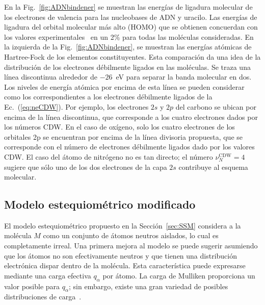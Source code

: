 En la Fig.~\ref{fig:ADNbindener} se muestran las energías de ligadura 
molecular de los electrones de valencia para las nucleobases de ADN y 
uracilo. Las energías de ligadura del orbital molecular más alto (HOMO) 
que se obtienen concuerdan con los valores 
experimentales~\cite{Hush,Verkin,Dougherty} en un 2\% para todas las 
moléculas consideradas. En la izquierda de la Fig.~\ref{fig:ADNbindener}, 
se muestran las energías atómicas de Hartree-Fock de los elementos 
constituyentes. Esta comparación da una idea de la distribución de los 
electrones débilmente ligados en las moléculas. Se traza una línea 
discontinua alrededor de $-26$~eV para separar la banda molecular en 
dos. Los niveles de energía atómica por encima de esta línea se pueden 
considerar como los correspondientes a los electrones débilmente ligados 
de la Ec.~(\ref{eq:neCDW}). Por ejemplo, los electrones $2s$ y $2p$ del 
carbono se ubican por encima de la línea discontinua, que corresponde a 
los cuatro electrones dados por los números CDW. En el caso de oxígeno, 
solo los cuatro electrones de los orbitales 2p se encuentran por encima 
de la línea divisoria propuesta, que se corresponde con el número de 
electrones débilmente ligados dado por los valores CDW. El caso del 
átomo de nitrógeno no es tan directo; el número $\nu_{N}^{\text{CDW}}=4$ 
sugiere que sólo uno de los dos electrones de la capa $2s$ contribuye al 
esquema molecular.

\subsection{Modelo estequiométrico modificado}

El modelo estequiométrico propuesto en la Sección~\ref{sec:SSM} 
considera a la molécula $M$ como un conjunto de átomos neutros aislados, 
lo cual es completamente irreal. Una primera mejora al modelo se puede 
sugerir asumiendo que los átomos no son efectivamente neutros y que 
tienen una distribución electrónica dispar dentro de la molécula. Esta 
característica puede expresarse mediante una carga efectiva $q_{\alpha}$ 
por átomo. La carga de Mulliken proporciona un valor posible para 
$q_{\alpha}$; sin embargo, existe una gran variedad de posibles 
distribuciones de carga~\cite{lee2003}.

